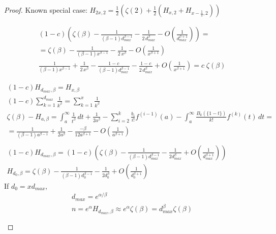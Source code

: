 \begin{proof}
    Known special case:
    $H_{2x,2}=\frac{1}{2}\left(\zeta(2)+\frac{1}{2}\left(H_{x,2}+H_{x-\frac{1}{2},2}\right)\right)$
    
    \begin{gather*}
        (1-c)\left(\zeta(\beta)-\frac{1}{(\beta-1)d_{max}^{\beta-1}}-\frac{1}{2\,d_{max}^\beta}-O\left(\frac{1}{d_{max}^{\beta+1}}\right)\right)=\\
        =\zeta(\beta)-\frac{1}{(\beta-1)x^{\beta-1}}-\frac{1}{2\,x^\beta}-O\left(\frac{1}{x^{\beta+1}}\right)\\
        \frac{1}{(\beta-1)x^{\beta-1}}+\frac{1}{2\,x^\beta}-\frac{1-c}{(\beta-1)d_{max}^{\beta-1}}-\frac{1-c}{2\,d_{max}^\beta}+O\left(\frac{1}{x^{\beta+1}}\right)=c\;\zeta(\beta)
    \end{gather*}
    
    \begin{gather*}
        (1-c)H_{d_{max},\beta}=H_{x,\beta}\\
        (1-c)\sum_{k=1}^{d_{max}}\frac{1}{k^\beta}=\sum_{k=1}^{x}\frac{1}{k^\beta}\\
        \zeta(\beta)-H_{a,\beta}=\int_a^\infty{\frac{1}{t^\beta}\,dt}
        +\frac{1}{2a^\beta}
        -\sum_{i=2}^k{\frac{b_i}{i!}f^{(i-1)}(a)}
        -\int_a^\infty{\frac{B_k(\{1-t\})}{k!}f^{(k)}(t)\,dt}=\\
        =\frac{1}{(\beta-1)a^{\beta-1}}
        +\frac{1}{2a^\beta}
        -\frac{-\beta}{12a^{\beta+1}}
        -O\left(\frac{1}{a^{\beta+1}}\right)\\\\
        (1-c)H_{d_{max},\beta}=(1-c)\left(\zeta(\beta)-\frac{1}{(\beta-1)d_{max}^{\beta-1}}
        -\frac{1}{2d_{max}^\beta}
        +O\left(\frac{1}{d_{max}^{\beta+1}}\right)\right)\\
        H_{d_0,\beta}=\zeta(\beta)-\frac{1}{(\beta-1)d_0^{\beta-1}}
        -\frac{1}{2d_0^\beta}
        +O\left(\frac{1}{d_0^{\beta+1}}\right)
    \end{gather*}
    If $d_0=xd_{max}$,
    \begin{gather*}
        d_{max}=e^{\alpha/\beta}\\
        n=e^\alpha H_{d_{max},\beta}\approx e^\alpha\zeta(\beta)
        =d_{max}^\beta\zeta(\beta)\\\\

\end{gather*}
\end{proof}
